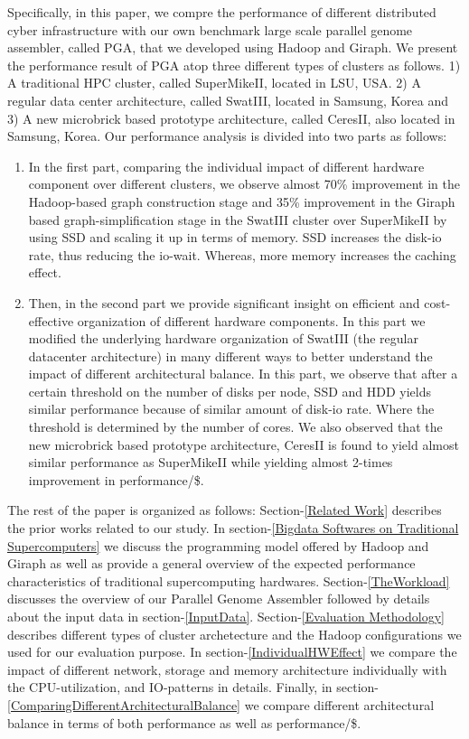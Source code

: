 \documentclass[conference]{IEEEtran}
\begin{document}
Specifically, in this paper, we compre the performance of different distributed cyber infrastructure with our own benchmark large scale parallel genome assembler, called PGA, that we developed using Hadoop and Giraph.
We present the performance result of PGA atop three different types of clusters as follows. 
1) A traditional HPC cluster, called SuperMikeII, located in LSU, USA. 
2) A regular data center architecture, called SwatIII, located in Samsung, Korea and 
3) A new microbrick based prototype architecture, called CeresII, also located in Samsung, Korea.
Our performance analysis is divided into two parts as follows:
\begin{enumerate}
\item In the first part, comparing the individual impact of different hardware component over different clusters, we observe almost 70\% improvement in the Hadoop-based graph construction stage and 35\% improvement in the Giraph based graph-simplification stage in the SwatIII cluster over SuperMikeII by using SSD and scaling it up in terms of memory. SSD increases the disk-io rate, thus reducing the io-wait. Whereas, more memory increases the caching effect.
\item Then, in the second part we provide significant insight on efficient and cost-effective organization of different hardware components. In this part we modified the underlying hardware organization of SwatIII (the regular datacenter architecture) in many different ways to better understand the impact of different architectural balance. In this part, we observe that after a certain threshold on the number of disks per node, SSD and HDD yields similar performance because of similar amount of disk-io rate. Where the threshold is determined by the number of cores. We also observed that the new microbrick based prototype architecture, CeresII is found to yield almost similar performance as SuperMikeII while yielding almost 2-times improvement in performance/\$. 
\end{enumerate}

The rest of the paper is organized as follows:
Section-\ref{Related Work} describes the prior works related to our study.
In section-\ref{Bigdata Softwares on Traditional Supercomputers} we discuss the programming model offered by Hadoop and Giraph as well as provide a general overview of the expected performance characteristics of traditional supercomputing hardwares.
Section-\ref{TheWorkload} discusses the overview of our Parallel Genome Assembler followed by details about the input data in section-\ref{InputData}.
Section-\ref{Evaluation Methodology} describes different types of cluster archetecture and the Hadoop configurations we used for our evaluation purpose.
In section-\ref{IndividualHWEffect} we compare the impact of different network, storage and memory architecture individually with the CPU-utilization, and IO-patterns in details.
Finally, in section-\ref{ComparingDifferentArchitecturalBalance} we compare different architectural balance in terms of both performance as well as performance/\$.
\end{document}

